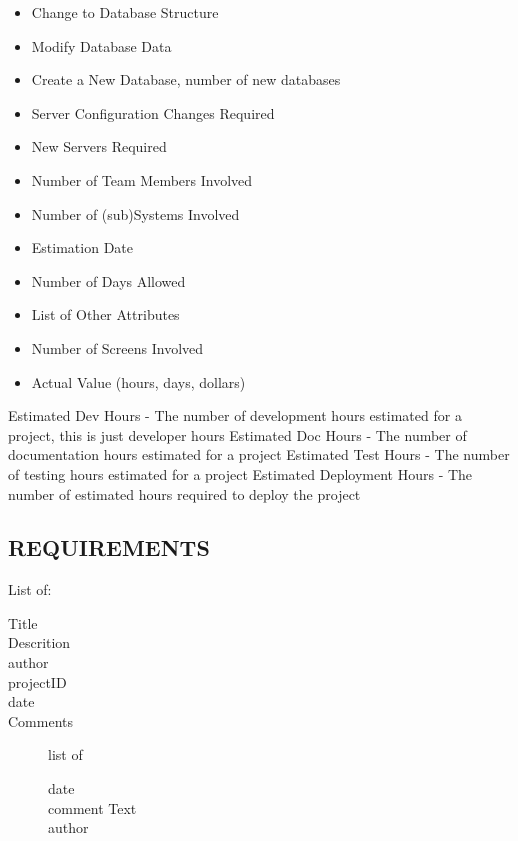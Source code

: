 \documentclass[SDSUThesis.tex]{subfiles}
\begin{document}
    \begin{itemize}
    \item Change to Database Structure  
    \item Modify Database Data    
    \item Create a New Database, number of new databases  
    \item Server Configuration Changes Required   
    \item New Servers Required   
    \item Number of Team Members Involved  
    \item Number of (sub)Systems Involved  
    \item Estimation Date
    \item Number of Days Allowed
    \item List of Other Attributes
    \item Number of Screens Involved 
    \item Actual Value (hours, days, dollars) 
    \end{itemize}
    
    
    Estimated Dev Hours - The number of development hours estimated for a project, this is just developer hours
    Estimated Doc Hours - The number of documentation hours estimated for a project
    Estimated Test Hours - The number of testing hours estimated for a project
    Estimated Deployment Hours - The number of estimated hours required to deploy the project
    
    \subsection{REQUIREMENTS}
    List of: 
    \begin{description}
      \item[Title] 
      \item[Descrition]
      \item[author]
      \item[projectID]
      \item[date]
      \item[Comments] list of \\
      \begin{description}
        \item[date]
        \item[comment Text]
        \item[author]
      \end{description}
    \end{description}
    
\end{document}
